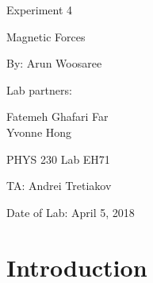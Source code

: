 \documentclass[letterpaper]{article}
\begin{document}
\begin{titlepage}
 \begin{center}
  \vspace*{1cm}
  \Huge
  Experiment 4
  \vspace{1cm}

  Magnetic Forces
  \vspace{1cm}

  By: Arun Woosaree
  \vspace{1cm}

  Lab partners:
  \vspace{.25cm}
  \Large

  Fatemeh Ghafari Far\\
  \vspace{.25cm}
  Yvonne Hong
  \vspace{1cm}

  \Huge
  PHYS 230 Lab EH71
  \vspace{1cm}

  TA: Andrei Tretiakov
  \vspace{1cm}

  Date of Lab: April 5, 2018%
  \vfill
 \end{center}
\end{titlepage}

\section{Introduction}
\end{document}
